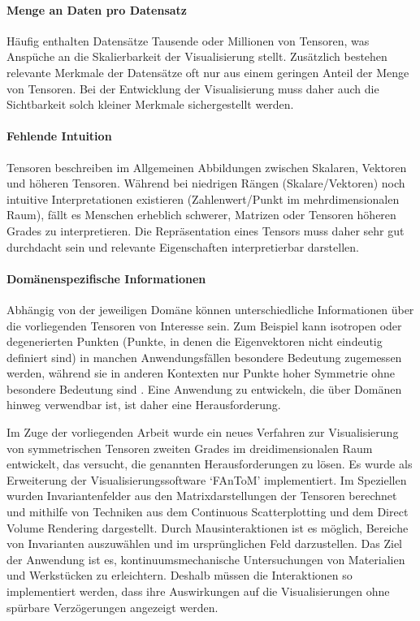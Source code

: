 \documentclass[a4paper,fontsize=12pt,toc=bib,halfparskip,ngerman]{scrartcl}
\begin{document}
\paragraph{Menge an Daten pro Datensatz}
H\"aufig enthalten Datens\"atze Tausende oder Millionen von Tensoren, was Ansp\"uche an die Skalierbarkeit der Visualisierung stellt. Zus\"atzlich bestehen relevante Merkmale der Datens\"atze oft nur aus einem geringen Anteil der Menge von Tensoren. Bei der Entwicklung der Visualisierung muss daher auch die Sichtbarkeit solch kleiner Merkmale sichergestellt werden.

\paragraph{Fehlende Intuition}
Tensoren beschreiben im Allgemeinen Abbildungen zwischen Skalaren, Vektoren und h\"oheren Tensoren. W\"ahrend bei niedrigen R\"angen (Skalare/Vektoren) noch intuitive Interpretationen existieren (Zahlenwert/Punkt im mehrdimensionalen Raum), f\"allt es Menschen erheblich schwerer, Matrizen oder Tensoren h\"oheren Grades zu interpretieren. Die Repr\"asentation eines Tensors muss daher sehr gut durchdacht sein und relevante Eigenschaften interpretierbar darstellen.

\paragraph{Dom\"anenspezifische Informationen}
Abh\"angig von der jeweiligen Dom\"ane k\"onnen unterschiedliche Informationen \"uber die vorliegenden Tensoren von Interesse sein.  Zum Beispiel kann isotropen oder degenerierten Punkten (Punkte, in denen die Eigenvektoren nicht eindeutig definiert sind) in manchen Anwendungsf\"allen besondere Bedeutung zugemessen werden, w\"ahrend sie in anderen Kontexten nur Punkte hoher Symmetrie ohne besondere Bedeutung sind \cite[S.~4]{hlawitschka2014top}. Eine Anwendung zu entwickeln, die \"uber Dom\"anen hinweg verwendbar ist, ist daher eine Herausforderung.


Im Zuge der vorliegenden Arbeit wurde ein neues Verfahren zur Visualisierung von symmetrischen Tensoren zweiten Grades im dreidimensionalen Raum entwickelt, das versucht, die genannten Herausforderungen zu l\"osen. Es wurde als Erweiterung der Visualisierungssoftware `FAnToM' implementiert. Im Speziellen wurden Invariantenfelder aus den Matrixdarstellungen der Tensoren berechnet und mithilfe von Techniken aus dem Continuous Scatterplotting und dem Direct Volume Rendering dargestellt. Durch Mausinteraktionen ist es m\"oglich, Bereiche von Invarianten auszuw\"ahlen und im urspr\"unglichen Feld darzustellen. Das Ziel der Anwendung ist es, kontinuumsmechanische Untersuchungen von Materialien und Werkst\"ucken zu erleichtern. Deshalb m\"ussen die Interaktionen so implementiert werden, dass ihre Auswirkungen auf die Visualisierungen ohne sp\"urbare Verz\"ogerungen angezeigt werden.
\end{document}
